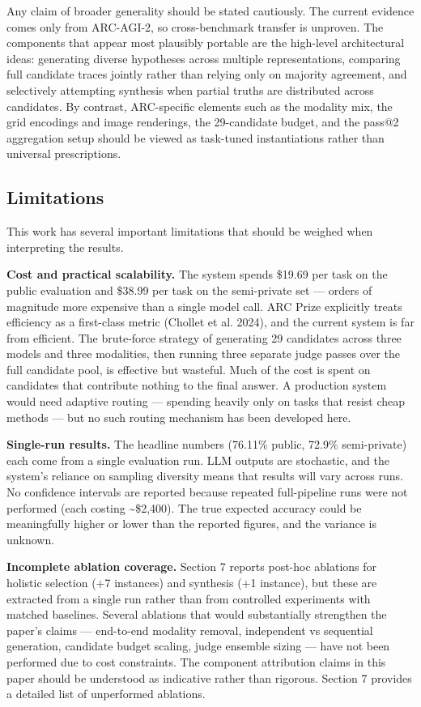 \documentclass[11pt]{article}
\begin{document}
Any claim of broader generality should be stated cautiously. The current
evidence comes only from ARC-AGI-2, so cross-benchmark transfer is
unproven. The components that appear most plausibly portable are the
high-level architectural ideas: generating diverse hypotheses across
multiple representations, comparing full candidate traces jointly rather
than relying only on majority agreement, and selectively attempting
synthesis when partial truths are distributed across candidates. By
contrast, ARC-specific elements such as the modality mix, the grid
encodings and image renderings, the 29-candidate budget, and the pass@2
aggregation setup should be viewed as task-tuned instantiations rather
than universal prescriptions.

\hypertarget{limitations}{%
\subsection{Limitations}\label{limitations}}

This work has several important limitations that should be weighed when
interpreting the results.

\textbf{Cost and practical scalability.} The system spends \$19.69 per
task on the public evaluation and \$38.99 per task on the semi-private
set --- orders of magnitude more expensive than a single model call. ARC
Prize explicitly treats efficiency as a first-class metric (Chollet et
al. 2024), and the current system is far from efficient. The brute-force
strategy of generating 29 candidates across three models and three
modalities, then running three separate judge passes over the full
candidate pool, is effective but wasteful. Much of the cost is spent on
candidates that contribute nothing to the final answer. A production
system would need adaptive routing --- spending heavily only on tasks
that resist cheap methods --- but no such routing mechanism has been
developed here.

\textbf{Single-run results.} The headline numbers (76.11\% public,
72.9\% semi-private) each come from a single evaluation run. LLM outputs
are stochastic, and the system's reliance on sampling diversity means
that results will vary across runs. No confidence intervals are reported
because repeated full-pipeline runs were not performed (each costing
\textasciitilde\$2,400). The true expected accuracy could be
meaningfully higher or lower than the reported figures, and the variance
is unknown.

\textbf{Incomplete ablation coverage.} Section 7 reports post-hoc
ablations for holistic selection (+7 instances) and synthesis (+1
instance), but these are extracted from a single run rather than from
controlled experiments with matched baselines. Several ablations that
would substantially strengthen the paper's claims --- end-to-end
modality removal, independent vs sequential generation, candidate budget
scaling, judge ensemble sizing --- have not been performed due to cost
constraints. The component attribution claims in this paper should be
understood as indicative rather than rigorous. Section 7 provides a
detailed list of unperformed ablations.
\end{document}
